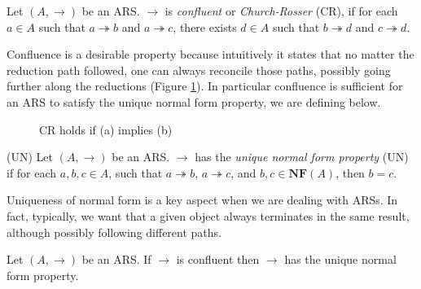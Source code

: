 \begin{definition}[Confluence]
	Let $(A,\rightarrow)$ be an ARS. $\rightarrow$ is \emph{confluent} or \emph{Church-Rosser} (CR), if for each $a\in A$ such that $a\twoheadrightarrow b$ and $a\twoheadrightarrow c$, there exists $d\in A$ such that $b\twoheadrightarrow d$ and $c\twoheadrightarrow d$.
\end{definition}
Confluence is a desirable property because intuitively it states that no matter the reduction path followed, one can always reconcile those paths, possibly going further along the reductions (Figure \ref{figure:confluence}). In particular confluence is sufficient for an ARS to satisfy the unique normal form property, we are defining below.
\begin{figure}
	\caption{CR holds if (a) implies (b)}
	\label{figure:confluence}
\end{figure}
\begin{definition}(UN)
	Let $(A,\rightarrow)$ be an ARS. $\rightarrow$ has the \emph{unique normal form property} (UN) if for each $a,b,c\in A$, such that $a\twoheadrightarrow b$, $a\twoheadrightarrow c$, and $b,c\in\mathbf{NF}(A)$, then $b= c$.
\end{definition}
Uniqueness of normal form is a key aspect when we are dealing with ARSs. In fact, typically, we want that a given object always terminates in the same result, although possibly following different paths.
\begin{proposition}
	Let $(A,\rightarrow)$ be an ARS. If $\rightarrow$ is confluent then $\rightarrow$ has the unique normal form property.
\end{proposition}

